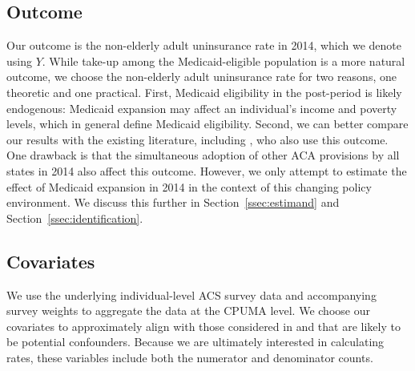 \documentclass[aoas]{imsart}
\theoremstyle{plain}
\theoremstyle{remark}
\begin{document}
\subsection{Outcome}

Our outcome is the non-elderly adult uninsurance rate in 2014, which we denote using $Y$. While take-up among the Medicaid-eligible population is a more natural outcome, we choose the non-elderly adult uninsurance rate for two reasons, one theoretic and one practical. First, Medicaid eligibility in the post-period is likely endogenous: Medicaid expansion may affect an individual's income and poverty levels, which in general define Medicaid eligibility. Second, we can better compare our results with the existing literature, including \cite{courtemanche2017early}, who also use this outcome. One drawback is that the simultaneous adoption of other ACA provisions by all states in 2014 also affect this outcome. However, we only attempt to estimate the effect of Medicaid expansion in 2014 in the context of this changing policy environment. We discuss this further in Section~\ref{ssec:estimand} and Section~\ref{ssec:identification}. 

\subsection{Covariates}

We use the underlying individual-level ACS survey data and accompanying survey weights to aggregate the data at the CPUMA level. We choose our covariates to approximately align with those considered in \cite{courtemanche2017early} and that are likely to be potential confounders. Because we are ultimately interested in calculating rates, these variables include both the numerator and denominator counts. 
\end{document}
